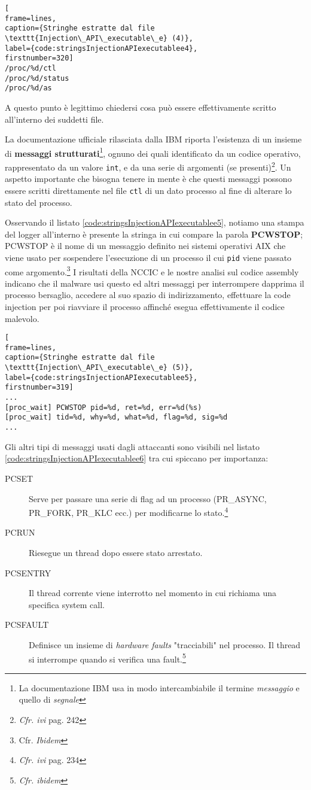 \documentclass[10pt,a4paper, titlepage]{report}
\begin{document}
\begin{lstlisting}[
frame=lines, 
caption={Stringhe estratte dal file \texttt{Injection\_API\_executable\_e} (4)}, 
label={code:stringsInjectionAPIexecutablee4},
firstnumber=320]
/proc/%d/ctl
/proc/%d/status
/proc/%d/as
\end{lstlisting}

A questo punto è legittimo chiedersi cosa può essere effettivamente scritto all'interno dei suddetti file.

La documentazione ufficiale rilasciata dalla IBM riporta l'esistenza di un insieme di \textbf{messaggi strutturati}\footnote{La documentazione IBM usa in modo intercambiabile il termine \textit{messaggio} e quello di \textit{segnale}}, ognuno dei quali identificato da un codice operativo, rappresentato da un valore \texttt{int}, e da una serie di argomenti (se presenti)\footnote{\textit{Cfr. ivi} pag. 242}. Un aspetto importante che bisogna tenere in mente è che questi messaggi possono essere scritti direttamente nel file \texttt{ctl} di un dato processo al fine di alterare lo stato del processo.

Osservando il listato \ref{code:stringsInjectionAPIexecutablee5}, notiamo una stampa del logger all'interno è presente la stringa in cui compare la parola \textbf{PCWSTOP}; PCWSTOP è il nome di un messaggio definito nei sistemi operativi AIX che viene usato per sospendere l'esecuzione di un processo il cui \texttt{pid} viene passato come argomento.\footnote{Cfr. \textit{Ibidem}}
I risultati della NCCIC e le nostre analisi sul codice assembly indicano che il malware usi questo ed altri messaggi per interrompere dapprima il processo bersaglio, accedere al suo spazio di indirizzamento, effettuare la code injection per poi riavviare il processo affinché esegua effettivamente il codice malevolo.

\begin{lstlisting}[
frame=lines, 
caption={Stringhe estratte dal file \texttt{Injection\_API\_executable\_e} (5)}, 
label={code:stringsInjectionAPIexecutablee5},
firstnumber=319]
...
[proc_wait] PCWSTOP pid=%d, ret=%d, err=%d(%s)
[proc_wait] tid=%d, why=%d, what=%d, flag=%d, sig=%d
...
\end{lstlisting}

Gli altri tipi di messaggi usati dagli attaccanti sono visibili nel listato \ref{code:stringsInjectionAPIexecutablee6} tra cui spiccano per importanza:

\begin{description}
\item[PCSET] Serve per passare una serie di flag ad un processo (PR\_ASYNC, PR\_FORK, PR\_KLC ecc.) per modificarne lo stato.\footnote{\textit{Cfr. ivi} pag. 234} 
\item[PCRUN] Riesegue un thread dopo essere stato arrestato.
\item[PCSENTRY] Il thread corrente viene interrotto nel momento in cui richiama una specifica system call. 
\item[PCSFAULT] Definisce un insieme di \textit{hardware faults} "tracciabili" nel processo. Il thread si interrompe quando si verifica una fault.\footnote{\textit{Cfr. ibidem}} 
\end{description}
\end{document}
